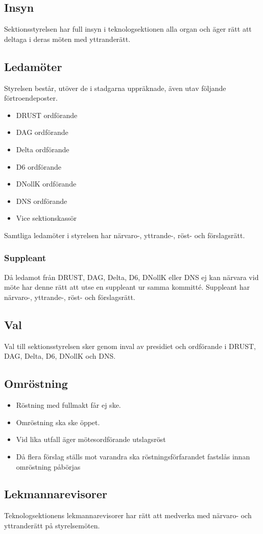 \subsection{Insyn} 

Sektionsstyrelsen har full insyn i teknologsektionen alla organ och äger rätt att deltaga i deras möten med yttranderätt. 

\subsection{Ledamöter}
Styrelsen består, utöver de i stadgarna uppräknade, även utav följande förtroendeposter. 
\begin{itemize}
  \item DRUST ordförande 
  \item DAG ordförande 
  \item Delta ordförande 
  \item D6 ordförande 
  \item DNollK ordförande
  \item DNS ordförande
  \item Vice sektionskassör
\end{itemize}

Samtliga ledamöter i styrelsen har närvaro-, yttrande-, röst- och förslagsrätt.

\subsubsection{Suppleant}
Då ledamot från DRUST, DAG, Delta, D6, DNollK eller DNS ej kan närvara vid möte har denne rätt att utse en suppleant ur samma kommitté.
Suppleant har närvaro-, yttrande-, röst- och förslagsrätt.

\subsection{Val}
Val till sektionsstyrelsen sker genom inval av presidiet och ordförande i DRUST, DAG, Delta, D6, DNollK och DNS.

\subsection{Omröstning} 

\begin{itemize}
  \item Röstning med fullmakt får ej ske. 
  \item Omröstning ska ske öppet.
  \item Vid lika utfall äger mötesordförande utslagsröst
  \item Då flera förslag ställs mot varandra ska röstningsförfarandet fastslås innan omröstning påbörjas
\end{itemize}

\subsection{Lekmannarevisorer}
Teknologsektionens lekmannarevisorer har rätt att medverka med närvaro-
och yttranderätt på styrelsemöten.
\newpage

